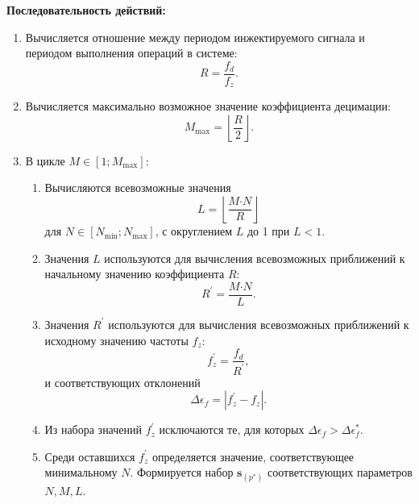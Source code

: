 \textbf{Последовательность действий:}
\begin{enumerate}
    \item Вычисляется отношение между периодом инжектируемого сигнала и периодом выполнения операций в системе:
        \begin{equation*}
            R = \frac{f_d}{f_z}.
        \end{equation*}
    \item Вычисляется максимально возможное значение коэффициента децимации:
        \begin{equation*}
            M_\text{max} = \left\lfloor \frac{R}{2} \right\rfloor.
        \end{equation*}
    \item В цикле ${M \in \left[ 1; M_\text{max} \right]}$:
    \begin{enumerate}
        \item Вычисляются всевозможные значения
            \begin{equation*}
                L = \left\lfloor \frac{M \mathord{\cdot} N}{R} \right\rfloor
            \end{equation*}
        для ${N \in \left[ N_\text{min}; N_\text{max} \right]}$, с округлением $L$ до 1 при ${L<1}$.
        \item Значения $L$ используются для вычисления всевозможных приближений к начальному значению коэффициента $R$:
            \begin{equation*}
                R^{'} = \frac{M \mathord{\cdot} N}{L}.
            \end{equation*}
        \item Значения ${R^{'}}$ используются для вычисления всевозможных приближений к исходному значению частоты ${f_z}$:
            \begin{equation*}
                f^{'}_z = \frac{f_d}{R^{'}},
            \end{equation*}
            и соответствующих отклонений
            \begin{equation*}
                \Delta\epsilon_{f} = \left| f^{'}_z - f_z \right|.
            \end{equation*}
        \item Из набора значений ${f^{'}_z}$ исключаются те, для которых ${\Delta\epsilon_{f} > \Delta\epsilon^{*}_f}$.
        \item Среди оставшихся ${f^{'}_{z}}$ определяется значение, соответствующее минимальному ${N}$. Формируется набор ${\mathbf{s}_{(p^{*})}}$ соответствующих параметров ${N, M, L}$.

\end{enumerate}
\end{enumerate}
